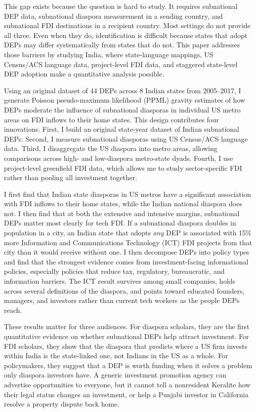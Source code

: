 \documentclass[12pt]{article}
\begin{document}
This gap exists because the question is hard to study. It requires subnational DEP data, subnational diaspora measurement in a sending country, and subnational FDI destinations in a recipient country. Most settings do not provide all three. Even when they do, identification is difficult because states that adopt DEPs may differ systematically from states that do not. This paper addresses those barriers by studying India, where state-language mappings, US Census/ACS language data, project-level FDI data, and staggered state-level DEP adoption make a quantitative analysis possible.

Using an original dataset of 44 DEPs across 8 Indian states from 2005--2017, I generate Poisson pseudo-maximum likelihood (PPML) gravity estimates of how DEPs moderate the influence of subnational diasporas in individual US metro areas on FDI inflows to their home states. This design contributes four innovations. First, I build an original state-year dataset of Indian subnational DEPs. Second, I measure subnational diasporas using US Census/ACS language data. Third, I disaggregate the US diaspora into metro areas, allowing comparisons across high- and low-diaspora metro-state dyads. Fourth, I use project-level greenfield FDI data, which allows me to study sector-specific FDI rather than pooling all investment together.

I first find that Indian state diasporas in US metros have a significant association with FDI inflows to their home states, while the Indian national diaspora does not. I then find that at both the extensive and intensive margins, subnational DEPs matter most clearly for tech FDI. If a subnational diaspora doubles in population in a city, an Indian state that adopts \textit{any} DEP is associated with 15\% more Information and Communications Technology (ICT) FDI projects from that city than it would receive without one. I then decompose DEPs into policy types and find that the strongest evidence comes from investment-facing informational policies, especially policies that reduce tax, regulatory, bureaucratic, and information barriers. The ICT result survives among small companies, holds across several definitions of the diaspora, and points toward educated founders, managers, and investors rather than current tech workers as the people DEPs reach.

These results matter for three audiences. For diaspora scholars, they are the first quantitative evidence on whether subnational DEPs help attract investment. For FDI scholars, they show that the diaspora that predicts where a US firm invests within India is the state-linked one, not Indians in the US as a whole. For policymakers, they suggest that a DEP is worth funding when it solves a problem only diaspora investors have. A generic investment promotion agency can advertise opportunities to everyone, but it cannot tell a nonresident Keralite how their legal status changes an investment, or help a Punjabi investor in California resolve a property dispute back home.
\end{document}
